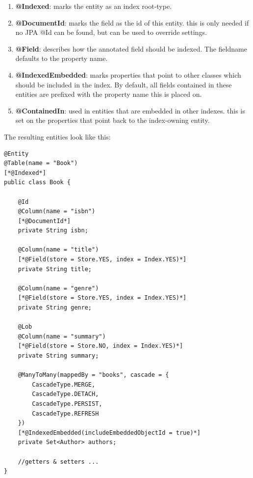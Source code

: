 \begin{enumerate}
	\item \textbf{@Indexed}: marks the entity as an index root-type.
	\item \textbf{@DocumentId}: marks the field as the id of this entity. this is only needed if no JPA @Id can be found, but can be used to override settings.
	\item \textbf{@Field}: describes how the annotated field should be indexed. The fieldname defaults to the property name.
	\item \textbf{@IndexedEmbedded}: marks properties that point to other classes which should be included in the index. By default, all fields contained in these entities are prefixed with the property name this is placed on.
	\item \textbf{@ContainedIn}: used in entities that are embedded in other indexes. this is set on the properties that point back to the index-owning entity.
\end{enumerate}
\noindent
The resulting entities look like this:
\\
\lstset{language=java}
\begin{lstlisting}[frame=htrbl, caption={Book.java with Hibernate Search annotations}, label={lst:book.java_2}]
@Entity
@Table(name = "Book")
[*@Indexed*]
public class Book {

	@Id
	@Column(name = "isbn")
	[*@DocumentId*]
	private String isbn;
	
	@Column(name = "title")
	[*@Field(store = Store.YES, index = Index.YES)*]
	private String title;
	
	@Column(name = "genre")
	[*@Field(store = Store.YES, index = Index.YES)*]
	private String genre;
	
	@Lob
	@Column(name = "summary")
	[*@Field(store = Store.NO, index = Index.YES)*]
	private String summary;
	
	@ManyToMany(mappedBy = "books", cascade = {
		CascadeType.MERGE,
		CascadeType.DETACH,
		CascadeType.PERSIST,
		CascadeType.REFRESH
	})
	[*@IndexedEmbedded(includeEmbeddedObjectId = true)*]
	private Set<Author> authors;
	
	//getters & setters ...
}
\end{lstlisting}

